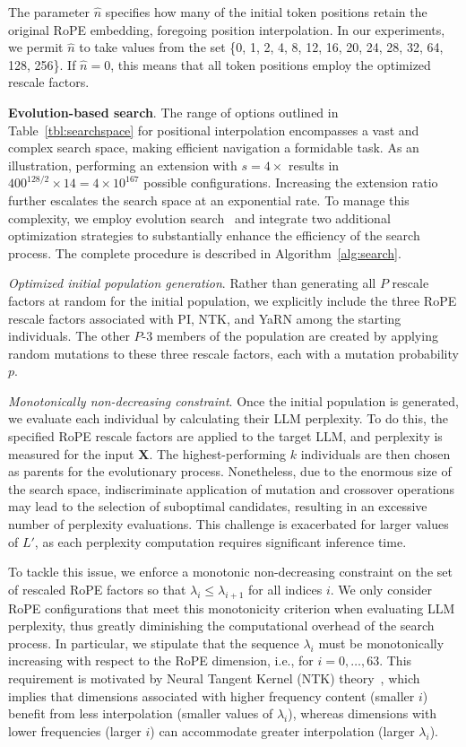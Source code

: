 The parameter $\hat{n}$ specifies how many of the initial token positions retain the original RoPE embedding, foregoing position interpolation. In our experiments, we permit $\hat{n}$ to take values from the set \{0, 1, 2, 4, 8, 12, 16, 20, 24, 28, 32, 64, 128, 256\}. If $\hat{n}=0$, this means that all token positions employ the optimized rescale factors.

\textbf{Evolution-based search}. The range of options outlined in Table~\ref{tbl:searchspace} for positional interpolation encompasses a vast and complex search space, making efficient navigation a formidable task. As an illustration, performing an extension with $s=4\times$ results in $400^{128/2}\times14=4\times10^{167}$ possible configurations. Increasing the extension ratio further escalates the search space at an exponential rate. To manage this complexity, we employ evolution search~\cite{guo2020single} and integrate two additional optimization strategies to substantially enhance the efficiency of the search process. The complete procedure is described in Algorithm~\ref{alg:search}.

\textit{Optimized initial population generation}. Rather than generating all $P$ rescale factors at random for the initial population, we explicitly include the three RoPE rescale factors associated with PI, NTK, and YaRN among the starting individuals. The other $P$-3 members of the population are created by applying random mutations to these three rescale factors, each with a mutation probability $p$.

\textit{Monotonically non-decreasing constraint}. Once the initial population is generated, we evaluate each individual by calculating their LLM perplexity. To do this, the specified RoPE rescale factors are applied to the target LLM, and perplexity is measured for the input $\mathbf{X}$. The highest-performing $k$ individuals are then chosen as parents for the evolutionary process. Nonetheless, due to the enormous size of the search space, indiscriminate application of mutation and crossover operations may lead to the selection of suboptimal candidates, resulting in an excessive number of perplexity evaluations. This challenge is exacerbated for larger values of $L'$, as each perplexity computation requires significant inference time.

To tackle this issue, we enforce a monotonic non-decreasing constraint on the set of rescaled RoPE factors so that $\lambda_i \leq \lambda_{i+1}$ for all indices $i$. We only consider RoPE configurations that meet this monotonicity criterion when evaluating LLM perplexity, thus greatly diminishing the computational overhead of the search process. In particular, we stipulate that the sequence $\lambda_i$ must be monotonically increasing with respect to the RoPE dimension, i.e., for $i = 0, \ldots, 63$. This requirement is motivated by Neural Tangent Kernel (NTK) theory~\cite{jacot2018neural,tancik2020fourier,ntk}, which implies that dimensions associated with higher frequency content (smaller $i$) benefit from less interpolation (smaller values of $\lambda_i$), whereas dimensions with lower frequencies (larger $i$) can accommodate greater interpolation (larger $\lambda_i$).

